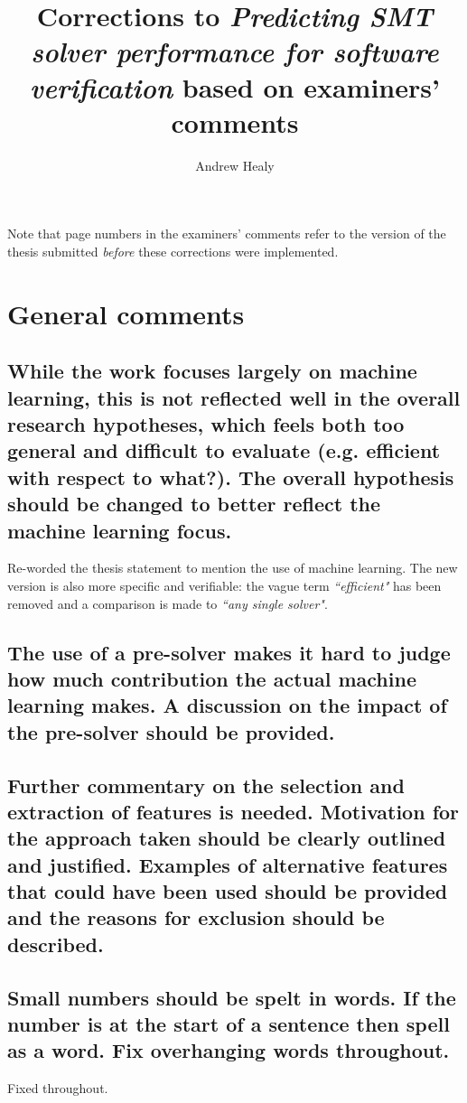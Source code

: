 \documentclass[]{article}
\title{Corrections to \emph{Predicting SMT solver performance for software verification} based on examiners' comments}
\author{Andrew Healy}
\begin{document}
\maketitle

Note that page numbers in the examiners' comments refer to the version of the thesis submitted \emph{before} these corrections were implemented.

\section{General comments}

\subsection{While the work focuses largely on machine learning, this is not reflected well in the overall research hypotheses, which feels both too general and difficult to evaluate (e.g. efficient with respect to what?). The overall hypothesis should be changed to better reflect the machine learning focus.}

\label{thesis-statement}

Re-worded the thesis statement to mention the use of machine learning. 
The new version is also more specific and verifiable: the vague term \emph{``efficient"} has been removed and a comparison is made to \emph{``any single solver"}.
 
\subsection{The use of a pre-solver makes it hard to judge how much contribution the actual machine learning makes. A discussion on the impact of the pre-solver should be provided.}
\label{presolving}
	
\subsection{Further commentary on the selection and extraction of features is needed. Motivation for the approach taken should be clearly outlined and justified. Examples of alternative features that could have been used should be provided and the reasons for exclusion should be described.}
\label{features}

\subsection{Small numbers should be spelt in words. If the number is at the start of a sentence then spell as a word. Fix overhanging words throughout.}
\label{overhang-numbers}
Fixed throughout.
\end{document}

